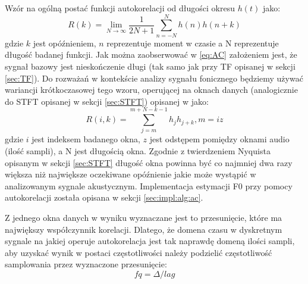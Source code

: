 \documentclass[12pt,a4paper,twoside]{mwart}
\begin{document}
Wzór na ogólną postać funkcji autokorelacji od długości okresu $h(t)$ jako:
\begin{equation}\label{eq:AC}
  R(k) = \lim_{N \to \infty} \frac{1}{2N + 1} \sum_{n=-N}^{N} h(n)h(n + k)
\end{equation}
gdzie $k$ jest opóźnieniem, $n$ reprezentuje moment w czasie a N reprezentuje długość badanej funkcji. Jak można zaobserwować w \ref{eq:AC} założeniem jest, że sygnał bazowy jest nieskończenie długi (tak samo jak przy TF opisanej w sekcji \ref{sec:TF}). Do rozważań w kontekście analizy sygnału fonicznego będziemy używać wariancji krótkoczasowej tego wzoru, operującej na oknach danych (analogicznie do STFT opisanej w sekcji \ref{sec:STFT}) opisanej w 
\cite[503]{Transcription:Talkin:RAPT}
 jako:
\begin{equation}\label{eq:STAC}
  R(i,k) = \sum_{j=m}^{m + N - k - 1} h_jh_{j+k}, m = iz
\end{equation}
gdzie $i$ jest indeksem badanego okna, $z$ jest odstępem pomiędzy oknami audio (ilość sampli), a N jest długością okna. Zgodnie z twierdzeniem Nyquista opisanym w sekcji \ref{sec:STFT} długość okna powinna być co najmniej dwa razy większa niż największe oczekiwane opóźnienie jakie może wystąpić w analizowanym sygnale akustycznym. Implementacja estymacji F0 przy pomocy autokorelacji została opisana w sekcji \ref{sec:impl:alg:ac}.

Z jednego okna danych w wyniku wyznaczane jest to przesunięcie, które ma największy współczynnik korelacji. Dlatego, że domena czasu w dyskretnym sygnale na jakiej operuje autokorelacja jest tak naprawdę domeną ilości sampli, aby uzyskać wynik w postaci częstotliwości należy podzielić częstotliwość samplowania przez wyznaczone przesunięcie:
\begin{equation}\label{eq:AC:hz}
  fq = \Delta/lag
\end{equation}
\end{document}
